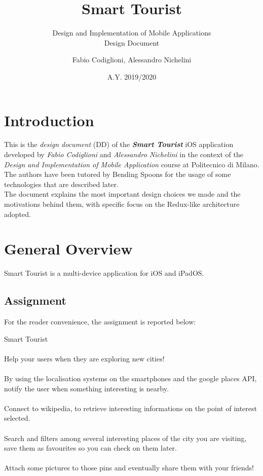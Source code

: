\documentclass[a4paper, 11pt, parskip=half]{scrreprt}
\title{Smart Tourist}
\subtitle{Design and Implementation of Mobile Applications\\Design Document}
\date{A.Y. 2019/2020}
\author{Fabio Codiglioni, Alessandro Nichelini}
\theoremstyle{definition}
\newenvironment{warn}[1][Warning:]{ %
	\medskip
	\begin{mdframed}[style=warning]
		\noindent{\textbf{#1}}
}{
	\end{mdframed}
}
\begin{document}
\maketitle
\tableofcontents
\newpage
{}



\chapter{Introduction}
This is the \textit{design document} (DD) of the \textbf{\textit{Smart Tourist}} iOS application developed by \textit{Fabio Codiglioni} and \textit{Alessandro Nichelini} in the context of the \textit{Design and Implementation of Mobile Application} course at Politecnico di Milano. The authors have been tutored by Bending Spoons for the usage of some technologies that are described later.\\
The document explains the most important design choices we made and the motivations behind them, with specific focus on the Redux-like architecture adopted.




\chapter{General Overview}
Smart Tourist is a multi-device application for iOS and iPadOS.

\section{Assignment}
For the reader convenience, the assignment is reported below:
\begin{warn}[Assignement:]
	 Smart Tourist
	 \\\\Help your users when they are exploring new cities!
	 \\\\By using the localisation systems on the smartphones and the google places API, notify the user when something interesting is nearby.
	 \\\\Connect to wikipedia, to retrieve interesting informations on the point of interest selected.
	 \\\\Search and filters among several interesting places of the city you are visiting, save them as favourites so you can check on them later.
	 \\\\Attach some pictures to those pins and eventually share them with your friends!
\end{warn}
\end{document}
